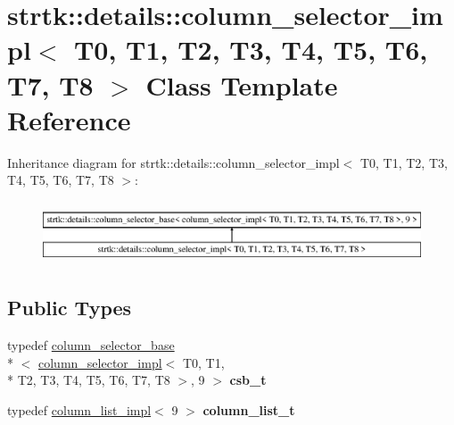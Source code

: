 \hypertarget{classstrtk_1_1details_1_1column__selector__impl_3_01T0_00_01T1_00_01T2_00_01T3_00_01T4_00_01T5_00_01T6_00_01T7_00_01T8_01_4}{\section{strtk\-:\-:details\-:\-:column\-\_\-selector\-\_\-impl$<$ T0, T1, T2, T3, T4, T5, T6, T7, T8 $>$ Class Template Reference}
\label{classstrtk_1_1details_1_1column__selector__impl_3_01T0_00_01T1_00_01T2_00_01T3_00_01T4_00_01T5_00_01T6_00_01T7_00_01T8_01_4}
}
Inheritance diagram for strtk\-:\-:details\-:\-:column\-\_\-selector\-\_\-impl$<$ T0, T1, T2, T3, T4, T5, T6, T7, T8 $>$\-:\begin{figure}[H]
\begin{center}
\leavevmode
\includegraphics[height=1.866667cm]{classstrtk_1_1details_1_1column__selector__impl_3_01T0_00_01T1_00_01T2_00_01T3_00_01T4_00_01T5_00_01T6_00_01T7_00_01T8_01_4}
\end{center}
\end{figure}
\subsection*{Public Types}
\begin{DoxyCompactItemize}
\item 
\hypertarget{classstrtk_1_1details_1_1column__selector__impl_3_01T0_00_01T1_00_01T2_00_01T3_00_01T4_00_01T5_00_01T6_00_01T7_00_01T8_01_4_a2c8bb80c9397891b76c9e05c9b0cb63d}{typedef \hyperlink{classstrtk_1_1details_1_1column__selector__base}{column\-\_\-selector\-\_\-base}\\*
$<$ \hyperlink{classstrtk_1_1details_1_1column__selector__impl}{column\-\_\-selector\-\_\-impl}$<$ T0, T1, \\*
T2, T3, T4, T5, T6, T7, T8 $>$, 9 $>$ {\bfseries csb\-\_\-t}}\label{classstrtk_1_1details_1_1column__selector__impl_3_01T0_00_01T1_00_01T2_00_01T3_00_01T4_00_01T5_00_01T6_00_01T7_00_01T8_01_4_a2c8bb80c9397891b76c9e05c9b0cb63d}

\item 
\hypertarget{classstrtk_1_1details_1_1column__selector__impl_3_01T0_00_01T1_00_01T2_00_01T3_00_01T4_00_01T5_00_01T6_00_01T7_00_01T8_01_4_abcc7b8cad8fb5f3665de184460092353}{typedef \hyperlink{structstrtk_1_1details_1_1column__list__impl}{column\-\_\-list\-\_\-impl}$<$ 9 $>$ {\bfseries column\-\_\-list\-\_\-t}}\label{classstrtk_1_1details_1_1column__selector__impl_3_01T0_00_01T1_00_01T2_00_01T3_00_01T4_00_01T5_00_01T6_00_01T7_00_01T8_01_4_abcc7b8cad8fb5f3665de184460092353}

\end{DoxyCompactItemize}
